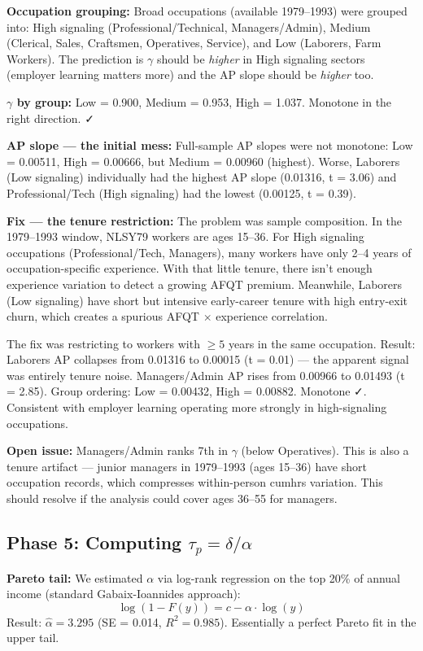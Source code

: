 \documentclass[11pt, letterpaper]{article}
\begin{document}
\textbf{Occupation grouping:} Broad occupations (available 1979--1993) were grouped into: High signaling (Professional/Technical, Managers/Admin), Medium (Clerical, Sales, Craftsmen, Operatives, Service), and Low (Laborers, Farm Workers). The prediction is $\gamma$ should be \textit{higher} in High signaling sectors (employer learning matters more) and the AP slope should be \textit{higher} too.

\textbf{$\gamma$ by group:} Low = 0.900, Medium = 0.953, High = 1.037. Monotone in the right direction. ✓

\textbf{AP slope --- the initial mess:} Full-sample AP slopes were not monotone: Low = 0.00511, High = 0.00666, but Medium = 0.00960 (highest). Worse, Laborers (Low signaling) individually had the highest AP slope (0.01316, t = 3.06) and Professional/Tech (High signaling) had the lowest (0.00125, t = 0.39).

\textbf{Fix --- the tenure restriction:} The problem was sample composition. In the 1979--1993 window, NLSY79 workers are ages 15--36. For High signaling occupations (Professional/Tech, Managers), many workers have only 2--4 years of occupation-specific experience. With that little tenure, there isn't enough experience variation to detect a growing AFQT premium. Meanwhile, Laborers (Low signaling) have short but intensive early-career tenure with high entry-exit churn, which creates a spurious AFQT $\times$ experience correlation.

The fix was restricting to workers with $\geq 5$ years in the same occupation. Result: Laborers AP collapses from 0.01316 to 0.00015 (t = 0.01) --- the apparent signal was entirely tenure noise. Managers/Admin AP rises from 0.00966 to 0.01493 (t = 2.85). Group ordering: Low = 0.00432, High = 0.00882. Monotone ✓. Consistent with employer learning operating more strongly in high-signaling occupations.

\textbf{Open issue:} Managers/Admin ranks 7th in $\gamma$ (below Operatives). This is also a tenure artifact --- junior managers in 1979--1993 (ages 15--36) have short occupation records, which compresses within-person cumhrs variation. This should resolve if the analysis could cover ages 36--55 for managers.

\subsection{Phase 5: Computing $\tau_p = \delta/\alpha$}

\textbf{Pareto tail:} We estimated $\alpha$ via log-rank regression on the top 20\% of annual income (standard Gabaix-Ioannides approach):
$$\log(1 - F(y)) = c - \alpha \cdot \log(y)$$
Result: $\hat{\alpha} = 3.295$ (SE = 0.014, $R^2 = 0.985$). Essentially a perfect Pareto fit in the upper tail.
\end{document}
